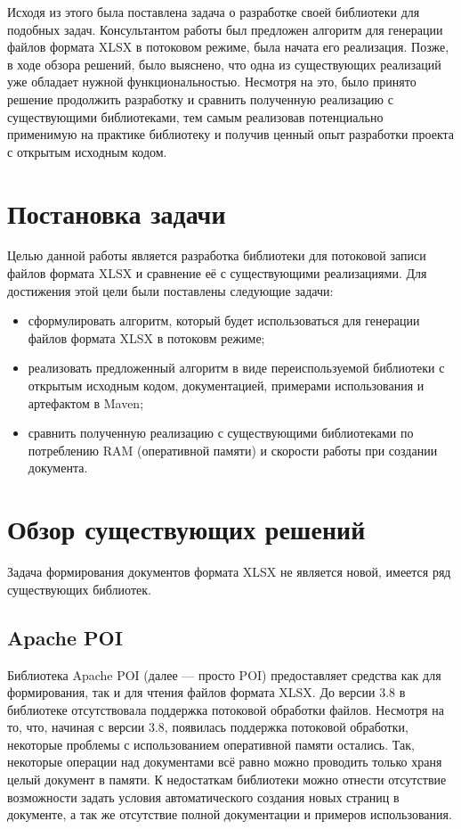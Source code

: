 \documentclass[14pt]{matmex-diploma-custom}
\begin{document}
Исходя из этого была поставлена задача о разработке своей библиотеки для подобных задач. Консультантом работы был предложен алгоритм для генерации файлов формата XLSX в потоковом режиме, была начата его реализация. Позже, в ходе обзора решений, было выяснено, что одна из существующих реализаций уже обладает нужной функциональностью. Несмотря на это, было принято решение продолжить разработку и сравнить полученную реализацию с существующими библиотеками, тем самым реализовав потенциально применимую на практике библиотеку и получив ценный опыт разработки проекта с открытым исходным кодом.

\section{Постановка задачи}
Целью данной работы является разработка библиотеки для потоковой записи файлов формата XLSX и сравнение её с существующими реализациями.
Для достижения этой цели были поставлены следующие задачи:
\begin{itemize}
    \item сформулировать алгоритм, который будет использоваться для генерации файлов формата XLSX в потоковм режиме;
    \item реализовать предложенный алгоритм в виде переиспользуемой библиотеки с открытым исходным кодом, документацией, примерами использования и артефактом в Maven;
    \item сравнить полученную реализацию с существующими библиотеками по потреблению RAM (оперативной памяти) и скорости работы при создании документа.
\end{itemize}

\section{Обзор существующих решений}
Задача формирования документов формата XLSX не является новой, имеется ряд существующих библиотек.
\subsection{Apache POI}
    Библиотека Apache POI \cite{poi} (далее --- просто POI) предоставляет средства как для формирования, так и для чтения файлов формата XLSX. До версии 3.8 в библиотеке отсутствовала поддержка потоковой обработки файлов. Несмотря на то, что, начиная с версии 3.8, появилась поддержка потоковой обработки, некоторые проблемы с использованием оперативной памяти остались. Так, некоторые операции над документами всё равно можно проводить только храня целый документ в памяти. К недостаткам библиотеки можно отнести отсутствие возможности задать условия автоматического создания новых страниц в документе, а так же отсутствие полной документации и примеров использования.
    
\end{document}
